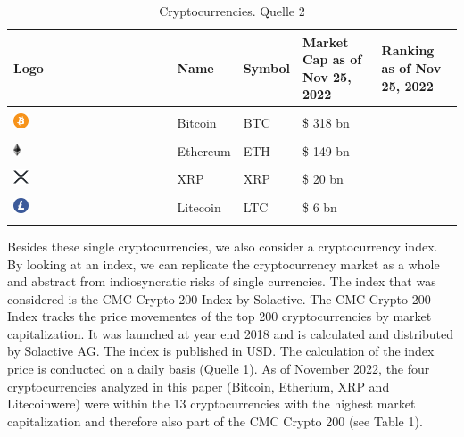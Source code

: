 \documentclass[11pt]{article}
\begin{document}
\begin{table}[H]
\centering %
\begin{tabular}{>{\centering\arraybackslash}m{} >{\centering\arraybackslash}m{} >{\centering\arraybackslash}m{} >{\centering\arraybackslash}m{} >{\centering\arraybackslash}m{}}
\hline
Logo & Name & Symbol & Market Cap as of Nov 25, 2022 & Ranking as of Nov 25, 2022\\
\hline
\\
\includegraphics[width=0.1\textwidth]{Bitcoin.png} &  Bitcoin & BTC & \$ 318 bn & 1\\
\\
\includegraphics[width=0.05\textwidth]{ETH.png} & Ethereum & ETH & \$ 149 bn & 2\\
\\
\includegraphics[width=0.1\textwidth]{XRP.png} & XRP & XRP & \$ 20 bn & 7\\
\\
\includegraphics[width=0.1\textwidth]{LTC.png} & Litecoin & LTC & \$ 6 bn & 13\\
\\
\hline
\end{tabular}
\caption{\label{tab1} Cryptocurrencies. Quelle 2}
\end{table}


Besides these single cryptocurrencies, we also consider a cryptocurrency index. By looking at an index, we can replicate the cryptocurrency market as a whole and abstract from indiosyncratic risks of single currencies. The index that was considered is the CMC Crypto 200 Index by Solactive. The CMC Crypto 200 Index tracks the price movementes of the top 200 cryptocurrencies by market capitalization. It was launched at year end 2018 and is calculated and distributed by Solactive AG. The index is published in USD. The calculation of the index price is conducted on a daily basis (Quelle 1). As of November 2022, the four cryptocurrencies analyzed in this paper (Bitcoin, Etherium,  XRP and Litecoinwere) were within the 13 cryptocurrencies with the highest market capitalization and therefore also part of the CMC Crypto 200 (see Table 1).
\end{document}
